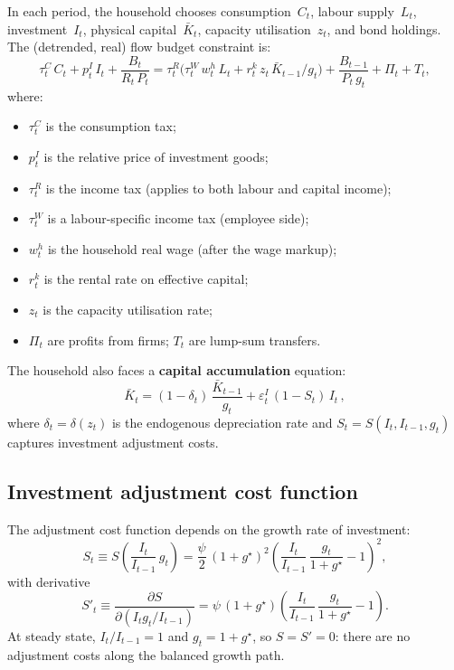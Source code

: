 \documentclass[11pt,a4paper]{article}
\newcommand{\bbar}[1]{\bar{#1}}
\begin{document}
In each period, the household chooses consumption~$C_t$,
labour supply~$L_t$, investment~$I_t$, physical capital~$\bbar K_t$, capacity
utilisation~$z_t$, and bond holdings. The (detrended, real) flow budget
constraint is:
\begin{equation}\label{eq:budget}
  \tau^C_t\, C_t + p^I_t\,I_t
  + \frac{B_t}{R_t\,P_t}
  = \tau^R_t\bigl(\tau^W_t\, w^h_t\, L_t
  + r^k_t\, z_t\, \bbar K_{t-1}/g_t\bigr)
  + \frac{B_{t-1}}{P_t\,g_t}
  + \Pi_t + T_t,
\end{equation}
where:
\begin{itemize}[nosep]
  \item $\tau^C_t$ is the consumption tax;
  \item $p^I_t$ is the relative price of investment goods;
  \item $\tau^R_t$ is the income tax (applies to both labour and capital income);
  \item $\tau^W_t$ is a labour-specific income tax (employee side);
  \item $w^h_t$ is the household real wage (after the wage markup);
  \item $r^k_t$ is the rental rate on effective capital;
  \item $z_t$ is the capacity utilisation rate;
  \item $\Pi_t$ are profits from firms; $T_t$ are lump-sum transfers.
\end{itemize}

\noindent The household also faces a \textbf{capital accumulation} equation:
\begin{equation}\label{eq:capital_accum}
  \bbar K_t = (1 - \delta_t)\,\frac{\bbar K_{t-1}}{g_t}
  + \varepsilon^I_t \,(1 - S_t)\, I_t\,,
\end{equation}
where $\delta_t = \delta(z_t)$ is the endogenous depreciation rate and
$S_t = S(I_t, I_{t-1}, g_t)$ captures investment adjustment costs.

\subsection{Investment adjustment cost function}

The adjustment cost function depends on the growth rate of investment:
\begin{equation}\label{eq:adj_cost}
  S_t \equiv S\!\left(\frac{I_t}{I_{t-1}}\,g_t\right)
  = \frac{\psi}{2}\,(1+g^{\star})^2
    \left(\frac{I_t}{I_{t-1}}\,\frac{g_t}{1+g^{\star}} - 1\right)^{\!2},
\end{equation}
with derivative
\begin{equation}\label{eq:adj_cost_deriv}
  S'_t \equiv \frac{\partial S}{\partial (I_t g_t / I_{t-1})}
  = \psi\,(1+g^{\star})
    \left(\frac{I_t}{I_{t-1}}\,\frac{g_t}{1+g^{\star}} - 1\right).
\end{equation}
At steady state, $I_t/I_{t-1} = 1$ and $g_t = 1+g^{\star}$, so
$S = S' = 0$: there are no adjustment costs along the balanced growth path.
\end{document}
